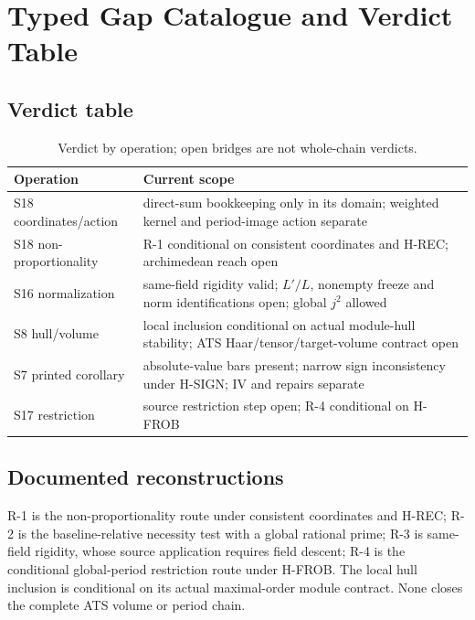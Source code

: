 \documentclass[11pt,a4paper]{article}
\theoremstyle{definition}
\theoremstyle{remark}
\begin{document}
\section{Typed Gap Catalogue and Verdict Table}\label{sec:catalogue}

\subsection{Verdict table}

\begin{table}[htbp]\centering\small
\caption{Verdict by operation; open bridges are not whole-chain verdicts.}
\label{tab:verdict}
\begin{tabularx}{\textwidth}{@{}>{\raggedright\arraybackslash}p{} >{\raggedright\arraybackslash}X@{}}
\toprule Operation & Current scope \\\midrule
S18 coordinates/action & direct-sum bookkeeping only in its domain; weighted kernel and period-image action separate \\
S18 non-proportionality & R-1 conditional on consistent coordinates and H-REC; archimedean reach open \\
S16 normalization & same-field rigidity valid; $L'/L$, nonempty freeze and norm identifications open; global $j^2$ allowed \\
S8 hull/volume & local inclusion conditional on actual module-hull stability; ATS Haar/tensor/target-volume contract open \\
S7 printed corollary & absolute-value bars present; narrow sign inconsistency under H-SIGN; IV and repairs separate \\
S17 restriction & source restriction step open; R-4 conditional on H-FROB \\
\bottomrule\end{tabularx}\end{table}

\subsection{Documented reconstructions}

R-1 is the non-proportionality route under consistent coordinates and H-REC;
R-2 is the baseline-relative necessity test with a global rational prime;
R-3 is same-field rigidity, whose source application requires field descent;
R-4 is the conditional global-period restriction route under H-FROB.
The local hull inclusion is conditional on its actual maximal-order module
contract. None closes the complete ATS volume or period chain.
\end{document}
